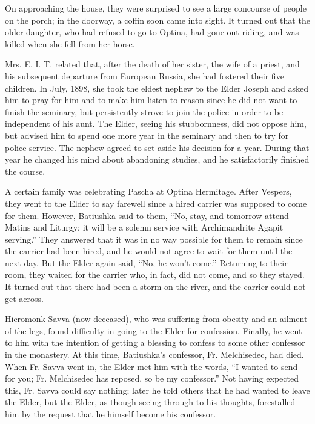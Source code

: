 On approaching the house, they were surprised to see a large concourse of people on the porch; in the doorway, a coffin soon came into sight. It turned out that the older daughter, who had refused to go to Optina, had gone out riding, and was killed when she fell from her horse.

Mrs. E. I. T. related that, after the death of her sister, the wife of a priest, and his subsequent departure from European Russia, she had fostered their five children. In July, 1898, she took the eldest nephew to the Elder Joseph and asked him to pray for him and to make him listen to reason since he did not want to finish the seminary, but persistently strove to join the police in order to be independent of his aunt. The Elder, seeing his stubbornness, did not oppose him, but advised him to spend one more year in the seminary and then to try for police service. The nephew agreed to set aside his decision for a year. During that year he changed his mind about abandoning studies, and he satisfactorily finished the course.

A certain family was celebrating Pascha at Optina Hermitage. After Vespers, they went to the Elder to say farewell since a hired carrier was supposed to come for them. However, Batiushka said to them, ``No, stay, and tomorrow attend Matins and Liturgy; it will be a solemn service with Archimandrite Agapit serving.'' They answered that it was in no way possible for them to remain since the carrier had been hired, and he would not agree to wait for them until the next day. But the Elder again said, ``No, he won't come.'' Returning to their room, they waited for the carrier who, in fact, did not come, and so they stayed. It turned out that there had been a storm on the river, and the carrier could not get across.

Hieromonk Savva (now deceased), who was suffering from obesity and an ailment of the legs, found difficulty in going to the Elder for confession. Finally, he went to him with the intention of getting a blessing to confess to some other confessor in the monastery. At this time, Batiushka's confessor, Fr. Melchisedec, had died. When Fr. Savva went in, the Elder met him with the words, ``I wanted to send for you; Fr. Melchisedec has reposed, so be my confessor.'' Not having expected this, Fr. Savva could say nothing; later he told others that he had wanted to leave the Elder, but the Elder, as though seeing through to his thoughts, forestalled him by the request that he himself become his confessor.


